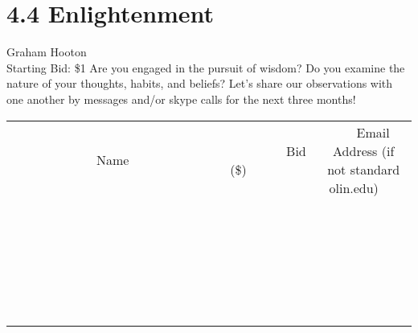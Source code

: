 \documentclass[11pt]{article}
\begin{document}
\section*{4.4 Enlightenment}
Graham Hooton
\\
Starting Bid: \$1
\newline
Are you engaged in the pursuit of wisdom? Do you examine the nature of your thoughts, habits, and beliefs? Let's share our observations with one another by messages and/or skype calls for the next three months!
\\[6ex]
\begin{tabular}{c c c}
~~~~~~~~~~~~~Name~~~~~~~~~~~~~ & ~~~~~~~~~Bid (\$)~~~~~~~~~  & ~~~Email Address (if not standard olin.edu)~~~\\
 & & \\
\hline
 & & \\
\hline
 & & \\
\hline
 & & \\
\hline
 & & \\
\hline
 & & \\
\hline
 & & \\
\hline
 & & \\
\hline
 & & \\
\hline
 & & \\
\hline
 & & \\
\hline
 & & \\
\hline
 & & \\
\hline
 & & \\
\hline
 & & \\
\hline
 & & \\
\hline
 & & \\
\hline
 & & \\
\hline
 & & \\
\hline
 & & \\
\hline
 & & \\
\hline
 & & \\
\hline
 & & \\
\hline
 & & \\
\hline
 & & \\
\hline
 & & \\
\hline
\end{tabular}
\newpage
\end{document}
